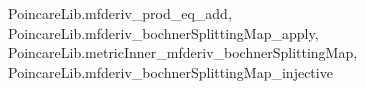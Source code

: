 \begin{proposition}
{  PoincareLib.mfderiv_prod_eq_add,
  PoincareLib.mfderiv_bochnerSplittingMap_apply,
  PoincareLib.metricInner_mfderiv_bochnerSplittingMap,
  PoincareLib.mfderiv_bochnerSplittingMap_injective}

\end{proposition}
